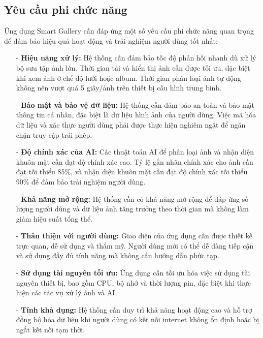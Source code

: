 \subsection{Yêu cầu phi chức năng}

Ứng dụng Smart Gallery cần đáp ứng một số yêu cầu phi chức năng quan trọng để đảm bảo hiệu quả hoạt động và trải nghiệm người dùng tốt nhất:

\begin{itemize}
    \item[-] \textbf{Hiệu năng xử lý:} Hệ thống cần đảm bảo tốc độ phản hồi nhanh dù xử lý bộ sưu tập ảnh lớn. Thời gian tải và hiển thị ảnh cần được tối ưu, đặc biệt khi xem ảnh ở chế độ lưới hoặc album. Thời gian phân loại ảnh tự động không nên vượt quá 5 giây/ảnh trên thiết bị cấu hình trung bình.
    
    \item[-] \textbf{Bảo mật và bảo vệ dữ liệu:} Hệ thống cần đảm bảo an toàn và bảo mật thông tin cá nhân, đặc biệt là dữ liệu hình ảnh của người dùng. Việc mã hóa dữ liệu và xác thực người dùng phải được thực hiện nghiêm ngặt để ngăn chặn truy cập trái phép.
    
    \item[-] \textbf{Độ chính xác của AI:} Các thuật toán AI để phân loại ảnh và nhận diện khuôn mặt cần đạt độ chính xác cao. Tỷ lệ gắn nhãn chính xác cho ảnh cần đạt tối thiểu 85\%, và nhận diện khuôn mặt cần đạt độ chính xác tối thiểu 90\% để đảm bảo trải nghiệm người dùng.
    
    \item[-] \textbf{Khả năng mở rộng:} Hệ thống cần có khả năng mở rộng để đáp ứng số lượng người dùng và dữ liệu ảnh tăng trưởng theo thời gian mà không làm giảm hiệu suất tổng thể.
    
    \item[-] \textbf{Thân thiện với người dùng:} Giao diện của ứng dụng cần được thiết kế trực quan, dễ sử dụng và thẩm mỹ. Người dùng mới có thể dễ dàng tiếp cận và sử dụng đầy đủ tính năng mà không cần hướng dẫn phức tạp.
    
    \item[-] \textbf{Sử dụng tài nguyên tối ưu:} Ứng dụng cần tối ưu hóa việc sử dụng tài nguyên thiết bị, bao gồm CPU, bộ nhớ và thời lượng pin, đặc biệt khi thực hiện các tác vụ xử lý ảnh và AI.
    
    \item[-] \textbf{Tính khả dụng:} Hệ thống cần duy trì khả năng hoạt động cao và hỗ trợ đồng bộ hóa dữ liệu khi người dùng có kết nối internet không ổn định hoặc bị ngắt kết nối tạm thời.
    

\end{itemize}
